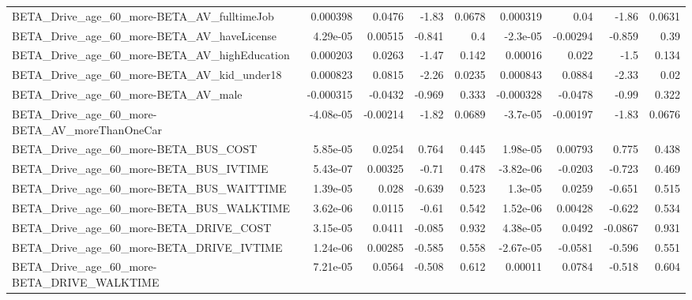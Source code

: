 \begin{tabular}{lrrrrrrrr}
BETA\_Drive\_age\_60\_more-BETA\_AV\_fulltimeJob         &    0.000398 &       0.0476 &    -1.83 &   0.0678 &   0.000319 &        0.04 &        -1.86 &        0.0631 \\
BETA\_Drive\_age\_60\_more-BETA\_AV\_haveLicense         &    4.29e-05 &      0.00515 &   -0.841 &      0.4 &   -2.3e-05 &    -0.00294 &       -0.859 &          0.39 \\
BETA\_Drive\_age\_60\_more-BETA\_AV\_highEducation       &    0.000203 &       0.0263 &    -1.47 &    0.142 &    0.00016 &       0.022 &         -1.5 &         0.134 \\
BETA\_Drive\_age\_60\_more-BETA\_AV\_kid\_under18         &    0.000823 &       0.0815 &    -2.26 &   0.0235 &   0.000843 &      0.0884 &        -2.33 &          0.02 \\
BETA\_Drive\_age\_60\_more-BETA\_AV\_male                &   -0.000315 &      -0.0432 &   -0.969 &    0.333 &  -0.000328 &     -0.0478 &        -0.99 &         0.322 \\
BETA\_Drive\_age\_60\_more-BETA\_AV\_moreThanOneCar      &   -4.08e-05 &     -0.00214 &    -1.82 &   0.0689 &   -3.7e-05 &    -0.00197 &        -1.83 &        0.0676 \\
BETA\_Drive\_age\_60\_more-BETA\_BUS\_COST               &    5.85e-05 &       0.0254 &    0.764 &    0.445 &   1.98e-05 &     0.00793 &        0.775 &         0.438 \\
BETA\_Drive\_age\_60\_more-BETA\_BUS\_IVTIME             &    5.43e-07 &      0.00325 &    -0.71 &    0.478 &  -3.82e-06 &     -0.0203 &       -0.723 &         0.469 \\
BETA\_Drive\_age\_60\_more-BETA\_BUS\_WAITTIME           &    1.39e-05 &        0.028 &   -0.639 &    0.523 &    1.3e-05 &      0.0259 &       -0.651 &         0.515 \\
BETA\_Drive\_age\_60\_more-BETA\_BUS\_WALKTIME           &    3.62e-06 &       0.0115 &    -0.61 &    0.542 &   1.52e-06 &     0.00428 &       -0.622 &         0.534 \\
BETA\_Drive\_age\_60\_more-BETA\_DRIVE\_COST             &    3.15e-05 &       0.0411 &   -0.085 &    0.932 &   4.38e-05 &      0.0492 &      -0.0867 &         0.931 \\
BETA\_Drive\_age\_60\_more-BETA\_DRIVE\_IVTIME           &    1.24e-06 &      0.00285 &   -0.585 &    0.558 &  -2.67e-05 &     -0.0581 &       -0.596 &         0.551 \\
BETA\_Drive\_age\_60\_more-BETA\_DRIVE\_WALKTIME         &    7.21e-05 &       0.0564 &   -0.508 &    0.612 &    0.00011 &      0.0784 &       -0.518 &         0.604 \\

\end{tabular}
